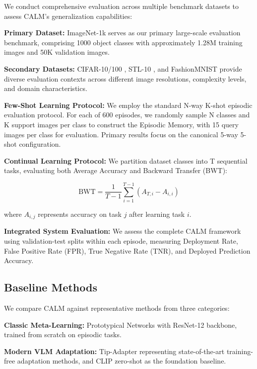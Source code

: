 \documentclass[conference]{IEEEtran}
\begin{document}
We conduct comprehensive evaluation across multiple benchmark datasets to assess CALM's generalization capabilities:

\textbf{Primary Dataset:} ImageNet-1k \cite{deng2009imagenet} serves as our primary large-scale evaluation benchmark, comprising 1000 object classes with approximately 1.28M training images and 50K validation images.

\textbf{Secondary Datasets:} CIFAR-10/100 \cite{krizhevsky2009learning}, STL-10 \cite{coates2011analysis}, and FashionMNIST \cite{xiao2017fashion} provide diverse evaluation contexts across different image resolutions, complexity levels, and domain characteristics.

\textbf{Few-Shot Learning Protocol:} We employ the standard N-way K-shot episodic evaluation protocol. For each of 600 episodes, we randomly sample N classes and K support images per class to construct the Episodic Memory, with 15 query images per class for evaluation. Primary results focus on the canonical 5-way 5-shot configuration.

\textbf{Continual Learning Protocol:} We partition dataset classes into T sequential tasks, evaluating both Average Accuracy and Backward Transfer (BWT):

\begin{equation}
\text{BWT} = \frac{1}{T-1} \sum_{i=1}^{T-1} (A_{T,i} - A_{i,i}) \label{eq:bwt}
\end{equation}

where $A_{i,j}$ represents accuracy on task $j$ after learning task $i$.

\textbf{Integrated System Evaluation:} We assess the complete CALM framework using validation-test splits within each episode, measuring Deployment Rate, False Positive Rate (FPR), True Negative Rate (TNR), and Deployed Prediction Accuracy.

\subsection{Baseline Methods}

We compare CALM against representative methods from three categories:

\textbf{Classic Meta-Learning:} Prototypical Networks \cite{snell2017prototypical} with ResNet-12 backbone, trained from scratch on episodic tasks.

\textbf{Modern VLM Adaptation:} Tip-Adapter \cite{zhang2021tip} representing state-of-the-art training-free adaptation methods, and CLIP zero-shot as the foundation baseline.
\end{document}
